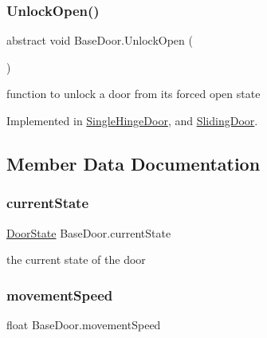 \subsubsection{\texorpdfstring{Unlock\+Open()}{UnlockOpen()}}
{\footnotesize\ttfamily abstract void Base\+Door.\+Unlock\+Open (\begin{DoxyParamCaption}{ }\end{DoxyParamCaption})\hspace{0.3cm}{\ttfamily [pure virtual]}}



function to unlock a door from it\textquotesingle{}s forced open state 



Implemented in \mbox{\hyperlink{class_single_hinge_door_a5e5785f02f35b8b109d4c50d3f912013}{Single\+Hinge\+Door}}, and \mbox{\hyperlink{class_sliding_door_af3b93ba6356b95277be1913224ad1415}{Sliding\+Door}}.



\subsection{Member Data Documentation}
\mbox{\label{class_base_door_a79de3a0eaae4ea2749f384224dce6692}} 
\subsubsection{\texorpdfstring{current\+State}{currentState}}
{\footnotesize\ttfamily \mbox{\hyperlink{class_base_door_a22e038571daf23b362eb8aaedc78cb43}{Door\+State}} Base\+Door.\+current\+State\hspace{0.3cm}{\ttfamily [protected]}}



the current state of the door 

\mbox{\label{class_base_door_aace8dcf06aaae9d78ebd0d55931ab3e3}} 
\subsubsection{\texorpdfstring{movement\+Speed}{movementSpeed}}
{\footnotesize\ttfamily float Base\+Door.\+movement\+Speed\hspace{0.3cm}{\ttfamily [protected]}}



